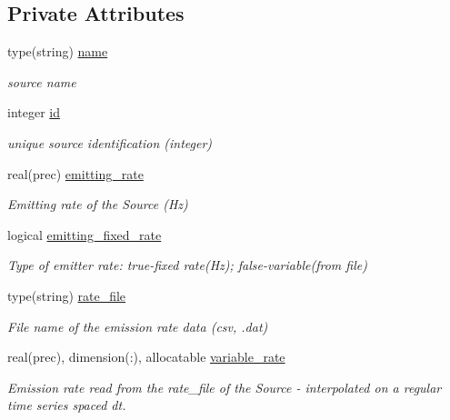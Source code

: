 \subsection*{Private Attributes}
\begin{DoxyCompactItemize}
\item 
type(string) \mbox{\hyperlink{structsources__mod_1_1source__par_ac56d7761e7da3a906a3f0fbf4c7f49f8}{name}}
\begin{DoxyCompactList}\small\item\em source name \end{DoxyCompactList}\item 
integer \mbox{\hyperlink{structsources__mod_1_1source__par_a88d333946d18fee527b7b207f44dd3ff}{id}}
\begin{DoxyCompactList}\small\item\em unique source identification (integer) \end{DoxyCompactList}\item 
real(prec) \mbox{\hyperlink{structsources__mod_1_1source__par_a8374d8f2d32dfa9e9f5863c7a45d0e1d}{emitting\+\_\+rate}}
\begin{DoxyCompactList}\small\item\em Emitting rate of the Source (Hz) \end{DoxyCompactList}\item 
logical \mbox{\hyperlink{structsources__mod_1_1source__par_a957d4184d9cd997abeac05c04821139c}{emitting\+\_\+fixed\+\_\+rate}}
\begin{DoxyCompactList}\small\item\em Type of emitter rate\+: true-\/fixed rate(\+Hz); false-\/variable(from file) \end{DoxyCompactList}\item 
type(string) \mbox{\hyperlink{structsources__mod_1_1source__par_ae236b50563bb0dadd55af1aadac3023e}{rate\+\_\+file}}
\begin{DoxyCompactList}\small\item\em File name of the emission rate data (csv, .dat) \end{DoxyCompactList}\item 
real(prec), dimension(\+:), allocatable \mbox{\hyperlink{structsources__mod_1_1source__par_ad5a8b90aed8636e98daafb1ede1390fd}{variable\+\_\+rate}}
\begin{DoxyCompactList}\small\item\em Emission rate read from the rate\+\_\+file of the Source -\/ interpolated on a regular time series spaced dt. \end{DoxyCompactList}\item 

\end{DoxyCompactItemize}
